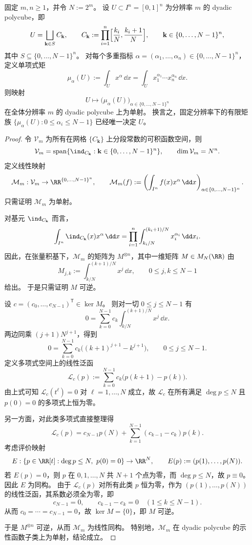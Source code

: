 \begin{theorem}\label{thm:spg-dyadic-finite-moment-completeness}
固定 \(m,n\ge 1\)，并令 \(N:=2^m\)。
设 \(U\subset I^n=[0,1]^n\) 为分辨率 \(m\) 的 dyadic polycube，即
\[
U=\bigsqcup_{\mathbf{k}\in S} C_{\mathbf{k}},
\qquad
C_{\mathbf{k}}:=\prod_{i=1}^{n}\Bigl[\frac{k_i}{N},\frac{k_i+1}{N}\Bigr],
\qquad
\mathbf{k}\in\{0,\dots,N-1\}^{n},
\]
其中 \(S\subseteq\{0,\dots,N-1\}^{n}\)。
对每个多重指标 \(\alpha=(\alpha_1,\dots,\alpha_n)\in\{0,\dots,N-1\}^{n}\)，定义单项式矩
\[
\mu_{\alpha}(U):=\int_{U}x^{\alpha}\,\dd x
=\int_U x_1^{\alpha_1}\cdots x_n^{\alpha_n}\,\dd x.
\]
则映射
\[
U\longmapsto \bigl(\mu_{\alpha}(U)\bigr)_{\alpha\in\{0,\dots,N-1\}^{n}}
\]
在全体分辨率 \(m\) 的 dyadic polycube 上为单射。
换言之，固定分辨率下的有限矩族
\(
\{\mu_{\alpha}(U):0\le \alpha_i\le N-1\}
\)
已经唯一决定 \(U\)。
\end{theorem}
\begin{proof}
令 \(\mathcal V_m\) 为所有在网格 \(\{C_{\mathbf{k}}\}\) 上分段常数的可积函数空间，则
\[
\mathcal V_m
=
\operatorname{span}\{\ind_{C_{\mathbf{k}}}:\mathbf{k}\in\{0,\dots,N-1\}^{n}\},
\qquad
\dim \mathcal V_m=N^n.
\]
定义线性映射
\[
\mathcal M_m:\mathcal V_m\to \RR^{\{0,\dots,N-1\}^{n}},
\qquad
\mathcal M_m(f):=\left(\int_{I^n}f(x)x^\alpha\,\dd x\right)_{\alpha\in\{0,\dots,N-1\}^{n}}.
\]
只需证明 \(\mathcal M_m\) 为单射。

对基元 \(\ind_{C_{\mathbf{k}}}\) 而言，
\[
\int_{I^n}\ind_{C_{\mathbf{k}}}(x)x^\alpha\,\dd x
=\prod_{i=1}^{n}\int_{k_i/N}^{(k_i+1)/N}x_i^{\alpha_i}\,\dd x_i.
\]
因此，在张量积基下，\(\mathcal M_m\) 的矩阵为 \(M^{\otimes n}\)，其中一维矩阵 \(M\in M_N(\RR)\) 由
\[
M_{j,k}:=\int_{k/N}^{(k+1)/N}x^j\,\dd x,
\qquad
0\le j,k\le N-1
\]
给出。
于是只需证明 \(M\) 可逆。

设 \(c=(c_0,\dots,c_{N-1})^{\mathsf T}\in\ker M\)。
则对一切 \(0\le j\le N-1\) 有
\[
0=\sum_{k=0}^{N-1}c_k\int_{k/N}^{(k+1)/N}x^j\,\dd x.
\]
两边同乘 \((j+1)N^{j+1}\)，得到
\[
0=\sum_{k=0}^{N-1}c_k\bigl((k+1)^{j+1}-k^{j+1}\bigr),
\qquad
0\le j\le N-1.
\]
定义多项式空间上的线性泛函
\[
\mathcal L_c(p):=\sum_{k=0}^{N-1}c_k\bigl(p(k+1)-p(k)\bigr).
\]
由上式可知 \(\mathcal L_c(t^\ell)=0\) 对 \(\ell=1,\dots,N\) 成立，故 \(\mathcal L_c\) 在所有满足 \(\deg p\le N\) 且 \(p(0)=0\) 的多项式上恒为零。

另一方面，对此类多项式直接整理得
\[
\mathcal L_c(p)
=
c_{N-1}p(N)+\sum_{k=1}^{N-1}(c_{k-1}-c_k)p(k).
\]
考虑评价映射
\[
E:\{p\in\RR[t]:\deg p\le N,\ p(0)=0\}\to \RR^N,
\qquad
E(p):=(p(1),\dots,p(N)).
\]
若 \(E(p)=0\)，则 \(p\) 在 \(0,1,\dots,N\) 共 \(N+1\) 个点为零，而 \(\deg p\le N\)，故 \(p\equiv 0\)。
因此 \(E\) 为同构。
由于 \(\mathcal L_c(p)\) 对所有此类 \(p\) 恒为零，作为 \((p(1),\dots,p(N))\) 的线性泛函，其系数必须全为零，即
\[
c_{N-1}=0,
\qquad
c_{k-1}-c_k=0\quad(1\le k\le N-1).
\]
从而 \(c_0=\cdots=c_{N-1}=0\)，故 \(\ker M=\{0\}\)，即 \(M\) 可逆。

于是 \(M^{\otimes n}\) 可逆，从而 \(\mathcal M_m\) 为线性同构。
特别地，\(\mathcal M_m\) 在 dyadic polycube 的示性函数子类上为单射，结论成立。
\end{proof}

